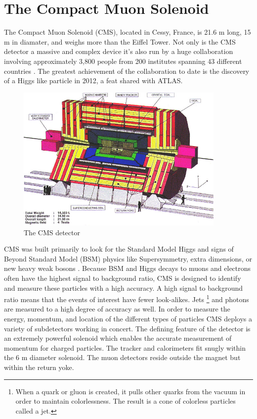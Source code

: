 \section{The Compact Muon Solenoid}

The Compact Muon Solenoid (CMS), located in Cessy, France, is 21.6 m long, 15 m in diamater, and weighs more than the Eiffel Tower. Not only is the CMS detector a massive and complex device it's also run by a huge collaboration involving approximately 3,800 people from 200 institutes spanning 43 different countries \cite{cmscollab}. The greatest achievement of the collaboration to date is the discovery of a Higgs like particle in 2012, a feat shared with ATLAS.

\begin{figure}[h!]
  \centering
  \includegraphics[width=4in]{images/CMSdetc3D.jpg}
  \caption
   {The CMS detector \cite{cmsweb}}
  \label{fig:cmsdet3d}
\end{figure}

CMS was built primarily to look for the Standard Model Higgs and signs of Beyond Standard Model (BSM) physics like Supersymmetry, extra dimensions, or new heavy weak bosons \cite{tdr}. Because BSM and Higgs decays to muons and electrons often have the highest signal to background ratio, CMS is designed to identify and measure these particles with a high accuracy. A high signal to background ratio means that the events of interest have fewer look-alikes. Jets \footnote{When a quark or gluon is created, it pulls other quarks from the vacuum in order to maintain colorlessness. The result is a cone of colorless particles called a jet.} and photons are measured to a high degree of accuracy as well. In order to measure the energy, momentum, and location of the different types of particles CMS deploys a variety of subdetectors working in concert. The defining feature of the detector is an extremely powerful solenoid which enables the accurate measurement of momentum for charged particles. The tracker and calorimeters fit snugly within the 6 m diameter solenoid. The muon detectors reside outside the magnet but within the return yoke.

